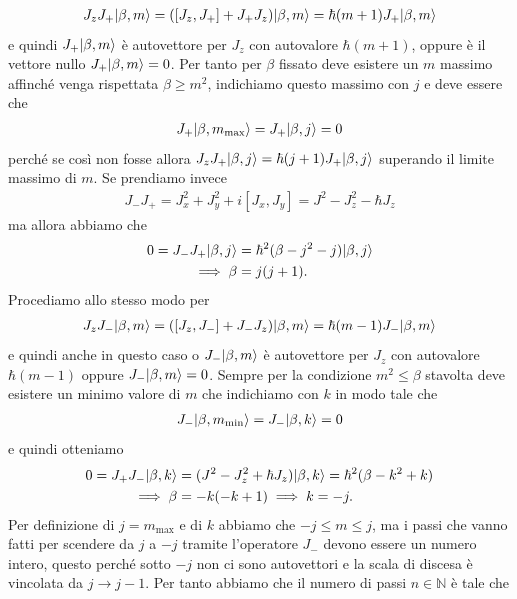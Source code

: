 \begin{align*}
  J_z J_+ \vert \beta, m \rangle = ([J_z, J_+] + J_+ J_z) \vert \beta,m \rangle = \hbar (m + 1) J_+ \vert \beta,m \rangle
\end{align*}
e quindi $ J_+ \vert \beta, m \rangle $ è autovettore per $ J_z $ con autovalore $ \hbar(m+1) $, oppure è il vettore nullo $ J_+\vert \beta,m \rangle = 0 $. Per tanto 
per $ \beta $ fissato deve esistere un $ m $ massimo affinché venga rispettata $ \beta \geq m^2 $, indichiamo questo massimo con $ j $ e deve essere che
\begin{align*}
  J_+ \vert \beta, m_\text{max} \rangle = J_+ \vert \beta, j \rangle = 0
\end{align*}
perché se così non fosse allora $ J_zJ_+\vert \beta,j \rangle = \hbar (j + 1) J_+\vert \beta, j \rangle $ superando il limite massimo di $ m $.
Se prendiamo invece 
\begin{align*}
  J_-J_+ = J_x^2 + J_y^2 + i[J_x, J_y] = J^2 - J_z^2 - \hbar J_z
\end{align*}
ma allora abbiamo che 
\begin{align*}
  0 = J_- J_+ \vert \beta, j \rangle &= \hbar^2(\beta - j^2 - j) \vert \beta,j \rangle 
  \\
  \implies \beta &= j(j+1).
\end{align*}
Procediamo allo stesso modo per 
\begin{align*}
  J_z J_- \vert \beta, m \rangle = ([J_z, J_-] + J_- J_z) \vert \beta,m \rangle = \hbar (m - 1) J_- \vert \beta,m \rangle
\end{align*}
e quindi anche in questo caso o $ J_-\vert \beta,m \rangle $ è autovettore per $ J_z $ con autovalore $ \hbar(m - 1) $ oppure $ J_-\vert \beta,m \rangle = 0 $. Sempre 
per la condizione $ m^2 \leq \beta $ stavolta deve esistere un minimo valore di $ m $ che indichiamo con $ k $ in modo tale che
\begin{align*}
  J_- \vert \beta, m_\text{min} \rangle = J_- \vert \beta, k \rangle = 0
\end{align*}
e quindi otteniamo 
\begin{align*}
  0 = J_+ J_- \vert \beta,k \rangle &= (J^2 - J_z^2 + \hbar J_z) \vert \beta,k \rangle = \hbar^2 (\beta - k^2 + k)
  \\
  \implies \beta &= -k(-k + 1) \implies k = -j.
\end{align*}
Per definizione di $ j = m_\text{max} $ e di $ k $ abbiamo che $ -j \leq m \leq j $, ma i passi che vanno fatti per scendere da $ j $ a $ -j $ tramite 
l'operatore $ J_- $ devono essere un numero intero, questo perché sotto $ -j $ non ci sono autovettori e la scala di discesa è vincolata da 
$ j \to j - 1 $. Per tanto abbiamo che il numero di passi $ n \in \mathbb{N} $ è tale che 
